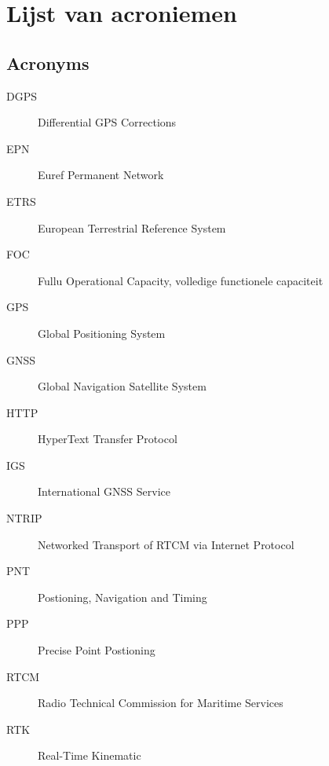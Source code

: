 \chapter*{Lijst van acroniemen}

\section*{Acronyms}
\begin{description}
	\item[DGPS] Differential GPS Corrections
	\item[EPN] Euref Permanent Network
	\item[ETRS] European Terrestrial Reference System
	\item[FOC] Fullu Operational Capacity, volledige functionele capaciteit
	\item[GPS] Global Positioning System
	\item[GNSS] Global Navigation Satellite System
	\item[HTTP] HyperText Transfer Protocol
	\item[IGS] International GNSS Service
	\item[NTRIP] Networked Transport of RTCM via Internet Protocol
	\item[PNT] Postioning, Navigation and Timing
	\item[PPP] Precise Point Postioning
	\item[RTCM] Radio Technical Commission for Maritime Services
	\item [RTK] Real-Time Kinematic
\end{description}

